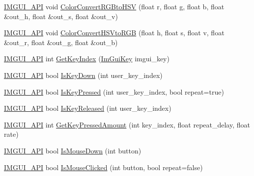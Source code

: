 \begin{DoxyCompactItemize}
\item 
\mbox{\hyperlink{imgui_8h_a43829975e84e45d1149597467a14bbf5}{I\+M\+G\+U\+I\+\_\+\+A\+PI}} void \mbox{\hyperlink{namespace_im_gui_aaed5ed34aaaa02b61cbb67598c0ad9ca}{Color\+Convert\+R\+G\+Bto\+H\+SV}} (float r, float g, float b, float \&out\+\_\+h, float \&out\+\_\+s, float \&out\+\_\+v)
\item 
\mbox{\hyperlink{imgui_8h_a43829975e84e45d1149597467a14bbf5}{I\+M\+G\+U\+I\+\_\+\+A\+PI}} void \mbox{\hyperlink{namespace_im_gui_a074427678b3e56378b7dcdefa4c8b5c7}{Color\+Convert\+H\+S\+Vto\+R\+GB}} (float h, float s, float v, float \&out\+\_\+r, float \&out\+\_\+g, float \&out\+\_\+b)
\item 
\mbox{\hyperlink{imgui_8h_a43829975e84e45d1149597467a14bbf5}{I\+M\+G\+U\+I\+\_\+\+A\+PI}} int \mbox{\hyperlink{namespace_im_gui_a6cf235f0d0787d51a93f6d90e0bdff9b}{Get\+Key\+Index}} (\mbox{\hyperlink{imgui_8h_a1671ca739cf1384a8cc268758f27b4e7}{Im\+Gui\+Key}} imgui\+\_\+key)
\item 
\mbox{\hyperlink{imgui_8h_a43829975e84e45d1149597467a14bbf5}{I\+M\+G\+U\+I\+\_\+\+A\+PI}} bool \mbox{\hyperlink{namespace_im_gui_a633d848504c89e7756ddd33474bc78d2}{Is\+Key\+Down}} (int user\+\_\+key\+\_\+index)
\item 
\mbox{\hyperlink{imgui_8h_a43829975e84e45d1149597467a14bbf5}{I\+M\+G\+U\+I\+\_\+\+A\+PI}} bool \mbox{\hyperlink{namespace_im_gui_a83331a8afa5316bc98ed9c98b151ac01}{Is\+Key\+Pressed}} (int user\+\_\+key\+\_\+index, bool repeat=true)
\item 
\mbox{\hyperlink{imgui_8h_a43829975e84e45d1149597467a14bbf5}{I\+M\+G\+U\+I\+\_\+\+A\+PI}} bool \mbox{\hyperlink{namespace_im_gui_a3fb25247181c5c292fe4f932bd20de88}{Is\+Key\+Released}} (int user\+\_\+key\+\_\+index)
\item 
\mbox{\hyperlink{imgui_8h_a43829975e84e45d1149597467a14bbf5}{I\+M\+G\+U\+I\+\_\+\+A\+PI}} int \mbox{\hyperlink{namespace_im_gui_ad94a09fc01052f02fe11bec5a3c11275}{Get\+Key\+Pressed\+Amount}} (int key\+\_\+index, float repeat\+\_\+delay, float rate)
\item 
\mbox{\hyperlink{imgui_8h_a43829975e84e45d1149597467a14bbf5}{I\+M\+G\+U\+I\+\_\+\+A\+PI}} bool \mbox{\hyperlink{namespace_im_gui_a8ddf4d05de8ab8b9aa70906a22a9973e}{Is\+Mouse\+Down}} (int button)
\item 
\mbox{\hyperlink{imgui_8h_a43829975e84e45d1149597467a14bbf5}{I\+M\+G\+U\+I\+\_\+\+A\+PI}} bool \mbox{\hyperlink{namespace_im_gui_a22b689cf4cf519590c2e2ad4f5462f29}{Is\+Mouse\+Clicked}} (int button, bool repeat=false)
\item 

\end{DoxyCompactItemize}
